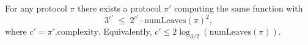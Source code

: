 \begin{theorem}
  \label{thm:complexity_log_leaves}
  For any protocol $\pi$ there exists a protocol $\pi'$ computing the same
  function with
  \[
    3^{c'} \;\le\; 2^{c'} \cdot \mathrm{numLeaves}(\pi)^2,
  \]
  where $c' = \pi'.\mathrm{complexity}$.
  Equivalently, $c' \le 2\log_{3/2}(\mathrm{numLeaves}(\pi))$.
\end{theorem}
